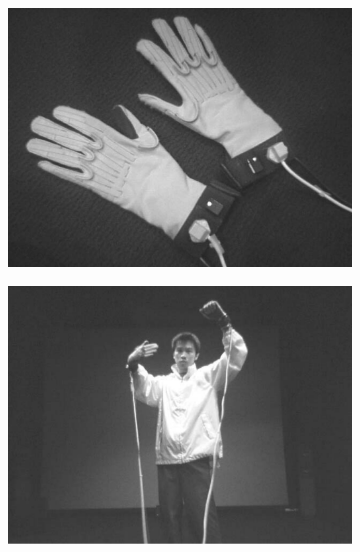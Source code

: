 \begin{figure}[ht]
	\centering
	\begin{subfigure}{0.32\textwidth}
		\centering
		\includegraphics[width=\textwidth]{images/related-work/cyber-gloves}
	\end{subfigure}
	\hfill
	\begin{subfigure}{0.32\textwidth}
		\centering
		\includegraphics[width=\textwidth]{images/related-work/cyber-gloves-example}
	\end{subfigure}
	\hfill
	\begin{subfigure}{0.32\textwidth}
		\centering

\end{subfigure}
\end{figure}
